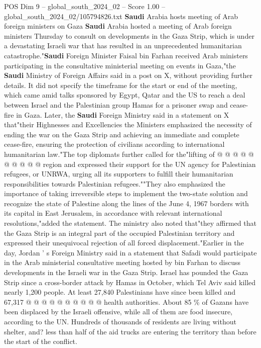 \begin{textsample}{POS Dim 9 – global\_south\_2024\_02 – Score 1.00 – global\_south\_2024\_02/105794826.txt}  \label{ex:f9_pos_103}
\textbf{Saudi} Arabia hosts meeting of Arab foreign ministers on Gaza \textbf{Saudi} Arabia hosted a meeting of Arab foreign ministers Thursday to consult on developments in the Gaza Strip, which is under a devastating Israeli war that has resulted in an unprecedented humanitarian catastrophe."\textbf{Saudi} Foreign Minister Faisal bin Farhan received Arab ministers participating in the consultative ministerial meeting on events in Gaza,"the \textbf{Saudi} Ministry of Foreign Affairs said in a post on X, without providing further details.
It did not specify the timeframe for the start or end of the meeting, which came amid talks sponsored by Egypt, Qatar and the US to reach a deal between Israel and the Palestinian group Hamas for a prisoner swap and cease-fire in Gaza.
Later, the \textbf{Saudi} Foreign Ministry said in a statement on X that"their Highnesses and Excellencies the Ministers emphasized the necessity of ending the war on the Gaza Strip and achieving an immediate and complete cease-fire, ensuring the protection of civilians according to international humanitarian law."The top diplomats further called for the"lifting of @ @ @ @ @ @ @ @ @ @ region and expressed their support for the UN agency for Palestinian refugees, or UNRWA, urging all its supporters to fulfill their humanitarian responsibilities towards Palestinian refugees.""They also emphasized the importance of taking irreversible steps to implement the two-state solution and recognize the state of Palestine along the lines of the June 4, 1967 borders with its capital in East Jerusalem, in accordance with relevant international resolutions,"added the statement.
The ministry also noted that"they affirmed that the Gaza Strip is an integral part of the occupied Palestinian territory and expressed their unequivocal rejection of all forced displacement."Earlier in the day, Jordan ' s Foreign Ministry said in a statement that Safadi would participate in the Arab ministerial consultative meeting hosted by bin Farhan to discuss developments in the Israeli war in the Gaza Strip.
Israel has pounded the Gaza Strip since a cross-border attack by Hamas in October, which Tel Aviv said killed nearly 1,200 people.
At least 27,840 Palestinians have since been killed and 67,317 @ @ @ @ @ @ @ @ @ @ health authorities.
About 85 \% of Gazans have been displaced by the Israeli offensive, while all of them are food insecure, according to the UN.
Hundreds of thousands of residents are living without shelter, and? less than half of the aid trucks are entering the territory than before the start of the conflict.

\end{textsample}
